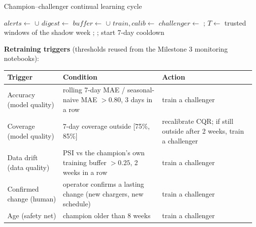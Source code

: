\documentclass[11pt,letterpaper]{article}
\begin{document}
\begin{algorithm}[H]
\caption{Champion--challenger continual learning cycle}
\small
\begin{algorithmic}[1]
  \State $alerts \gets$  $\cup$ 
  \State $digest \gets$  
  \State {} 
   \State {} \EndIf
    \State $buffer \gets$  $\cup$ 
    \State $train, calib \gets$ 
    \State $challenger \gets$ 
    \State {}; 
  \EndIf
    \State $T \gets$ trusted windows of the shadow week 
        \State {};  
      \EndIf
    \Else \State {}; start 7-day cooldown
    \EndIf
  \EndIf
\EndProcedure
\end{algorithmic}
\end{algorithm}

\textbf{Retraining triggers} (thresholds reused from the Milestone 3 monitoring notebooks):

\begin{table}[H]
\centering\small
\begin{tabularx}{\textwidth}{@{}lYY@{}}
\toprule
Trigger & Condition & Action \\
\midrule
Accuracy (model quality) & rolling 7-day MAE / seasonal-naive MAE $>0.80$, 3 days in a row & train a challenger \\
Coverage (model quality) & 7-day coverage outside [75\%, 85\%] & recalibrate CQR; if still outside after 2 weeks, train a challenger \\
Data drift (data quality) & PSI vs the champion's own training buffer $>0.25$, 2 weeks in a row & train a challenger \\
Confirmed change (human) & operator confirms a lasting change (new chargers, new schedule) & train a challenger \\
Age (safety net) & champion older than 8 weeks & train a challenger \\
\bottomrule
\end{tabularx}
\end{table}
\end{document}
